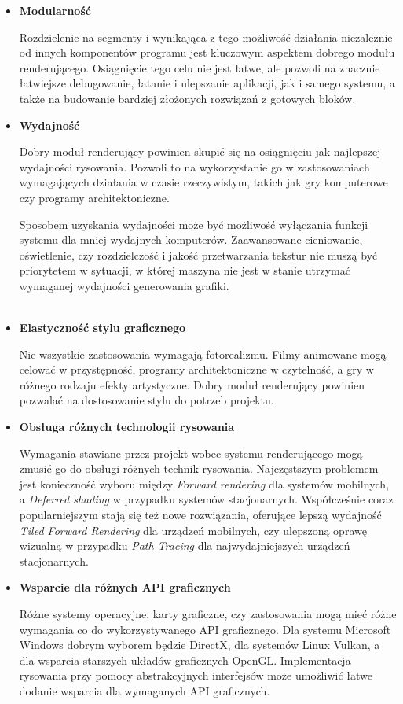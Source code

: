 \begin{itemize}
	\item \textbf{Modularność}
	
	Rozdzielenie na segmenty i wynikająca z tego możliwość działania niezależnie od innych komponentów programu jest kluczowym aspektem dobrego modułu renderującego. Osiągnięcie tego celu nie jest łatwe, ale pozwoli na znacznie łatwiejsze debugowanie, łatanie i ulepszanie aplikacji, jak i samego systemu, a także na budowanie bardziej złożonych rozwiązań z gotowych bloków.
	
	\item \textbf{Wydajność}
	
	Dobry moduł renderujący powinien skupić się na osiągnięciu jak najlepszej wydajności rysowania. Pozwoli to na wykorzystanie go w zastosowaniach wymagających działania w czasie rzeczywistym, takich jak gry komputerowe czy programy architektoniczne.
	
	Sposobem uzyskania wydajności może być możliwość wyłączania funkcji systemu dla mniej wydajnych komputerów. Zaawansowane cieniowanie, oświetlenie, czy rozdzielczość i jakość przetwarzania tekstur nie muszą być priorytetem w sytuacji, w której maszyna nie jest w stanie utrzymać wymaganej wydajności generowania grafiki.
\\ \\
	\item \textbf{Elastyczność stylu graficznego}

	Nie wszystkie zastosowania wymagają fotorealizmu. Filmy animowane mogą celować w przystępność, programy architektoniczne w czytelność, a gry w różnego rodzaju efekty artystyczne. Dobry moduł renderujący powinien pozwalać na dostosowanie stylu do potrzeb projektu.

	\item \textbf{Obsługa różnych technologii rysowania}

	Wymagania stawiane przez projekt wobec systemu renderującego mogą zmusić go do obsługi różnych technik rysowania. Najczęstszym problemem jest konieczność wyboru między \emph{Forward rendering} dla systemów mobilnych, a \emph{Deferred shading} w przypadku systemów stacjonarnych. Współcześnie coraz popularniejszym stają się też nowe rozwiązania, oferujące lepszą wydajność \emph{Tiled Forward Rendering} dla urządzeń mobilnych, czy ulepszoną oprawę wizualną w przypadku \emph{Path Tracing} dla najwydajniejszych urządzeń stacjonarnych.

	\item \textbf{Wsparcie dla różnych API graficznych}
	
	Różne systemy operacyjne, karty graficzne, czy zastosowania mogą mieć różne wymagania co do wykorzystywanego API graficznego. Dla systemu Microsoft Windows dobrym wyborem będzie DirectX, dla systemów Linux Vulkan, a dla wsparcia starszych układów graficznych OpenGL. Implementacja rysowania przy pomocy abstrakcyjnych interfejsów może umożliwić łatwe dodanie wsparcia dla wymaganych API graficznych.
\end{itemize}

